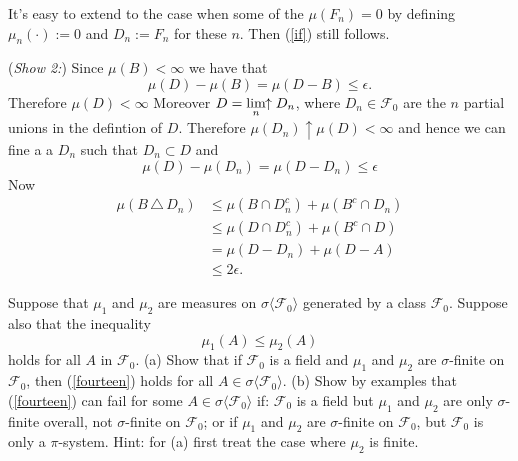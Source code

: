 \begin{exerciseproof}
It's easy to extend to the case when some of the $\mu(F_n)=0$ by defining $\mu_n (\cdot):=0$ and $D_n:=F_n$ for these $n$. Then (\ref{if}) still follows.

\textbullet({\sl Show 2:})
Since $\mu(B)<\infty$ we have that
\begin{equation}
 \mu(D)-\mu(B)=\mu(D-B)\leq \epsilon.
\end{equation}
Therefore $\mu(D)<\infty$
Moreover $D=\displaystyle\lim_{n}\!\!\uparrow D_n$, where $D_n\in \mathcal F_0$ are the $n$ partial unions in the defintion of $D$.
Therefore $\mu(D_n)\uparrow \mu(D)<\infty$ and hence we can fine a
 a $D_n$ such that $D_n\subset D$ and
\begin{equation}
\mu(D) - \mu(D_n)=\mu(D - D_n)\leq \epsilon
\end{equation}
Now
\begin{align*}
\mu(B\,\triangle\, D_n)
&\leq \mu(B\cap D_n^c) + \mu(B^c \cap D_n)\\
&\leq \mu(D \cap D_n^c) + \mu(B^c \cap D)\\
&= \mu(D - D_n) + \mu(D - A)\\
&\leq 2\epsilon.
\end{align*}
\end{exerciseproof}






\begin{exercise}
Suppose that $\mu_1$ and $\mu_2$ are measures on  $\sigma\langle \mathcal F_0\rangle$ generated by a class $\mathcal F_0$. Suppose also that the inequality
\begin{equation}
\label{fourteen}
\mu_1(A)\leq \mu_2(A)
\end{equation}
holds for all $A$ in $\mathcal F_0$. (a) Show that if $\mathcal F_0$ is a field and $\mu_1$ and $\mu_2$ are $\sigma$-finite on $\mathcal F_0$, then (\ref{fourteen}) holds for all $A\in\sigma\langle \mathcal F_0\rangle$. (b) Show by examples that (\ref{fourteen}) can fail for some $A\in\sigma\langle \mathcal F_0\rangle$ if: $\mathcal F_0$ is a field but $\mu_1$ and $\mu_2$ are only $\sigma$-finite  overall, not $\sigma$-finite on $\mathcal F_0$; or if $\mu_1$ and $\mu_2$ are $\sigma$-finite on $\mathcal F_0$, but $\mathcal F_0$ is only a $\pi$-system. Hint: for (a) first treat the case where $\mu_2$ is finite.
\end{exercise}




